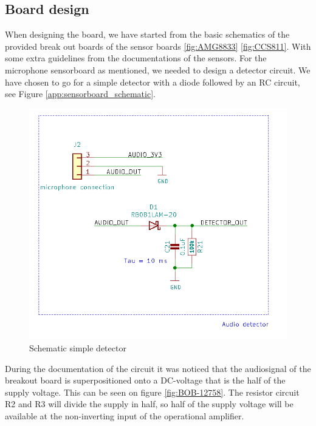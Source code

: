 \documentclass[11pt,a4paper]{article}
\begin{document}
\subsection{Board design}
When designing the board, we have started from the basic schematics of the provided break out boards of the sensor boards \ref{fig:AMG8833} \ref{fig:CCS811}. With some extra guidelines from the documentations of the sensors. For the microphone sensorboard as mentioned, we needed to design a detector circuit. We have chosen to go for a simple detector with a diode followed by an RC circuit, see Figure \ref{app:sensorboard_schematic}.
\begin{figure}[H]
	\centering
	\includegraphics[width=0.8\linewidth]{Schematic audio detector.png}
	\caption{Schematic simple detector}
	\label{fig:simple_detector}
\end{figure}
During the documentation of the circuit it was noticed that the audiosignal of the breakout board is superpositioned onto a DC-voltage that is the half of the supply voltage. This can be seen on figure \ref{fig:BOB-12758}. The resistor circuit R2 and R3 will divide the supply in half, so half of the supply voltage will be available at the non-inverting input of the operational amplifier.
\end{document}

